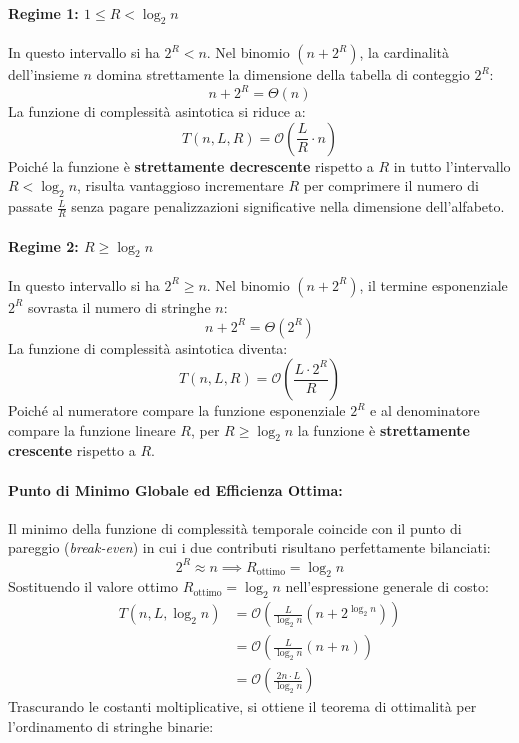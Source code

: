 \paragraph{Regime 1: $1 \le R < \log_2 n$}
In questo intervallo si ha $2^R < n$. Nel binomio $(n + 2^R)$, la cardinalit\`a dell'insieme $n$ domina strettamente la dimensione della tabella di conteggio $2^R$:
\begin{equation}
  n + 2^R = \Theta(n)
\end{equation}
La funzione di complessit\`a asintotica si riduce a:
\begin{equation}
  T(n, L, R) = \mathcal{O}\left( \frac{L}{R} \cdot n \right)
\end{equation}
Poich\'e la funzione \`e \textbf{strettamente decrescente} rispetto a $R$ in tutto l'intervallo $R < \log_2 n$, risulta vantaggioso incrementare $R$ per comprimere il numero di passate $\frac{L}{R}$ senza pagare penalizzazioni significative nella dimensione dell'alfabeto.

\paragraph{Regime 2: $R \ge \log_2 n$}
In questo intervallo si ha $2^R \ge n$. Nel binomio $(n + 2^R)$, il termine esponenziale $2^R$ sovrasta il numero di stringhe $n$:
\begin{equation}
  n + 2^R = \Theta(2^R)
\end{equation}
La funzione di complessit\`a asintotica diventa:
\begin{equation}
  T(n, L, R) = \mathcal{O}\left( \frac{L \cdot 2^R}{R} \right)
\end{equation}
Poich\'e al numeratore compare la funzione esponenziale $2^R$ e al denominatore compare la funzione lineare $R$, per $R \ge \log_2 n$ la funzione \`e \textbf{strettamente crescente} rispetto a $R$.

\paragraph{Punto di Minimo Globale ed Efficienza Ottima:}
Il minimo della funzione di complessit\`a temporale coincide con il punto di pareggio (\textit{break-even}) in cui i due contributi risultano perfettamente bilanciati:
\begin{equation}
  2^R \approx n \implies R_{\text{ottimo}} = \log_2 n
\end{equation}
Sostituendo il valore ottimo $R_{\text{ottimo}} = \log_2 n$ nell'espressione generale di costo:
\begin{align}
  T(n, L, \log_2 n) &= \mathcal{O}\left( \frac{L}{\log_2 n} (n + 2^{\log_2 n}) \right) \nonumber \\
                    &= \mathcal{O}\left( \frac{L}{\log_2 n} (n + n) \right) \nonumber \\
                    &= \mathcal{O}\left( \frac{2n \cdot L}{\log_2 n} \right)
\end{align}
Trascurando le costanti moltiplicative, si ottiene il teorema di ottimalit\`a per l'ordinamento di stringhe binarie:


